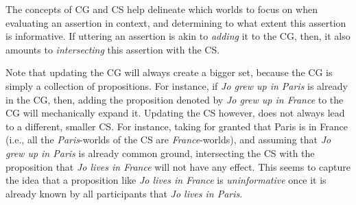 The concepts of CG and CS help delineate which worlds to focus on when evaluating an assertion in context, and determining to what extent this assertion is informative. If uttering an assertion is akin to \textit{adding} it to the CG, then, it also amounts to \textit{intersecting} this assertion with the CS.

\begin{exe}
	\label{ex1:common-ground-update}
	\label{ex1:context-set-update}
\end{exe}

Note that updating the CG will always create a bigger set, because the CG is simply a collection of propositions. For instance, if \textit{Jo grew up in Paris} is already in the CG, then, adding the proposition denoted by \textit{Jo grew up in France} to the CG will mechanically expand it. Updating the CS however, does not always lead to a different, smaller CS. For instance, taking for granted that Paris is in France (i.e., all the \textit{Paris}-worlds of the CS are \textit{France}-worlds), and assuming that \textit{Jo grew up in Paris} is already common ground, intersecting the CS with the proposition that \textit{Jo lives in France} will not have any effect. This seems to capture the idea that a proposition like \textit{Jo lives in France} is \textit{uninformative} once it is already known by all participants that \textit{Jo lives in Paris}.

